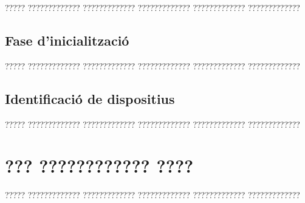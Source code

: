 \documentclass[11pt,catalan,listoffigures,listoftables]{tfgetsinf}
\begin{document}
????? ????????????? ????????????? ????????????? ????????????? ?????????????

\section{Fase d'inicialització}

????? ????????????? ????????????? ????????????? ????????????? ?????????????

\section{Identificació de dispositius}

????? ????????????? ????????????? ????????????? ????????????? ?????????????



\chapter{??? ???????????? ????}

????? ????????????? ????????????? ????????????? ????????????? ????????????? 



\end{document}
